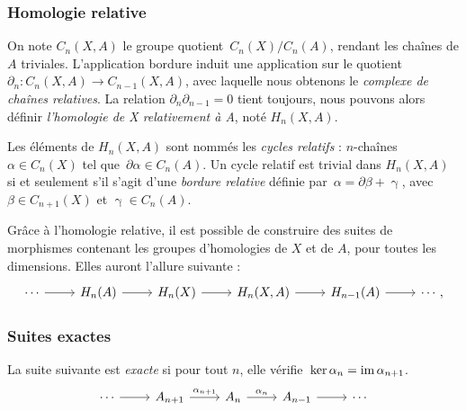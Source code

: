 \subsubsection{Homologie relative}
\begin{definition}
On note $C_n(X,A)$ le groupe quotient~$C_n(X)/C_n(A)$, rendant les chaînes de $A$ triviales. L'application bordure induit une application sur le quotient $\partial_n:C_n(X,A)\to C_{n-1}(X,A)$, avec laquelle nous obtenons le \emph{complexe de chaînes relatives}. La relation $\partial_n\partial_{n-1}=0$ tient toujours, nous pouvons alors définir \emph{l'homologie de X relativement à A}, noté $H_n(X,A)$.

Les éléments de $H_n(X,A)$ sont nommés les \emph{cycles relatifs} : $n$-chaînes $\alpha\in C_n(X)$ tel que~${\partial\alpha\in C_n(A)}$. Un cycle relatif est trivial dans $H_n(X,A)$ si et seulement s'il s'agit d'une \emph{bordure relative} définie par~$\alpha=\partial\beta+\upgamma$, avec $\beta\in C_{n+1}(X)$ et $\upgamma\in C_n(A)$.
\end{definition}

Grâce à l'homologie relative, il est possible de construire des suites de morphismes contenant les groupes d'homologies de $X$ et de $A$, pour toutes les dimensions. Elles auront l'allure suivante : \[\begin{tikzcd}
\cdots\arrow[r]&H_n(A)\arrow[r]&H_n(X)\arrow[r]&H_n(X,A)\arrow[r]&H_{n-1}(A)\arrow[r]&\cdots,
\end{tikzcd}\]

\subsubsection{Suites exactes}

\begin{definition}
La suite suivante est \emph{exacte} si pour tout $n$, elle vérifie~${\ker\alpha_{n}=\mathrm{im}\,\alpha_{n+1}}$. \[\begin{tikzcd}
\cdots\arrow[r]&A_{n+1}\arrow[r, "\alpha_{n+1}"]&A_n\arrow[r, "\alpha_n"]&A_{n-1}\arrow[r]&\cdots
\end{tikzcd}\]
\end{definition}

